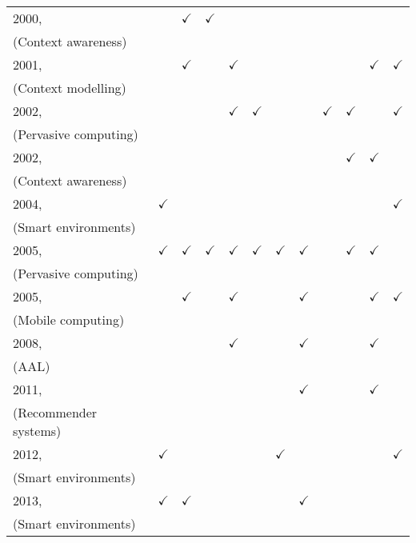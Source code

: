 \begin{table}
\begin{tabular}{l c c c c c c c c c c c }
    2000,~\citet{chen_survey_2000} 		&  & $\checkmark$ & $\checkmark$ &  &  &  &  &  &  &  &  \\
    (Context awareness)\\
    2001,~\citet{jameson_modelling_2001} 	&  & $\checkmark$ &  & $\checkmark$ &  &  &  &  &  & $\checkmark$ & $\checkmark$ \\
    (Context modelling)\\
    2002,~\citet{henricksen_modeling_2002} 	&   &  &  & $\checkmark$ & $\checkmark$ &  &  & $\checkmark$ & $\checkmark$ &  & $\checkmark$ \\
    (Pervasive computing)\\
    2002,~\citet{held_modeling_2002} 		&  &  &  &  &  &  &  &  & $\checkmark$ & $\checkmark$  &  \\
    (Context awareness)\\
    2004,~\citet{gu_toward_2004} 		& $\checkmark$ &  &  &  &  &  &  &  &  &  & $\checkmark$ \\
    (Smart environments)\\
    2005,~\citet{chen_using_2005} 		& $\checkmark$ & $\checkmark$ & $\checkmark$ & $\checkmark$ & $\checkmark$ & $\checkmark$ & $\checkmark$ &  & $\checkmark$ & $\checkmark$ & \\
    (Pervasive computing)\\
    2005,~\citet{yamabe_citron_2005} 		&  & $\checkmark$ &  & $\checkmark$ &  &  & $\checkmark$ &  &  & $\checkmark$ & $\checkmark$ \\
    (Mobile computing)\\
    2008,~\citet{wood_context_aware_2008} 	&  &  &  & $\checkmark$ &  &  & $\checkmark$ &  &  & $\checkmark$ &  \\
    (AAL)\\
    2011,~\citet{baltrunas_incarmusic_2011} 	&  &  &  &  &  &  & $\checkmark$ &  &  & $\checkmark$ &  \\ 
    (Recommender systems)\\
    2012,~\citet{mcavoy_ontology_based_2012} 	& $\checkmark$ &  &  &  &  & $\checkmark$ &  &  &  &  & $\checkmark$  \\
    (Smart environments)\\
    2013,~\citet{almeida_assessing_2012}	& $\checkmark$ & $\checkmark$ &  &  &  &  & $\checkmark$ &  &  &  &  \\
    (Smart environments)\\
\hline

\end{tabular}
\end{table}